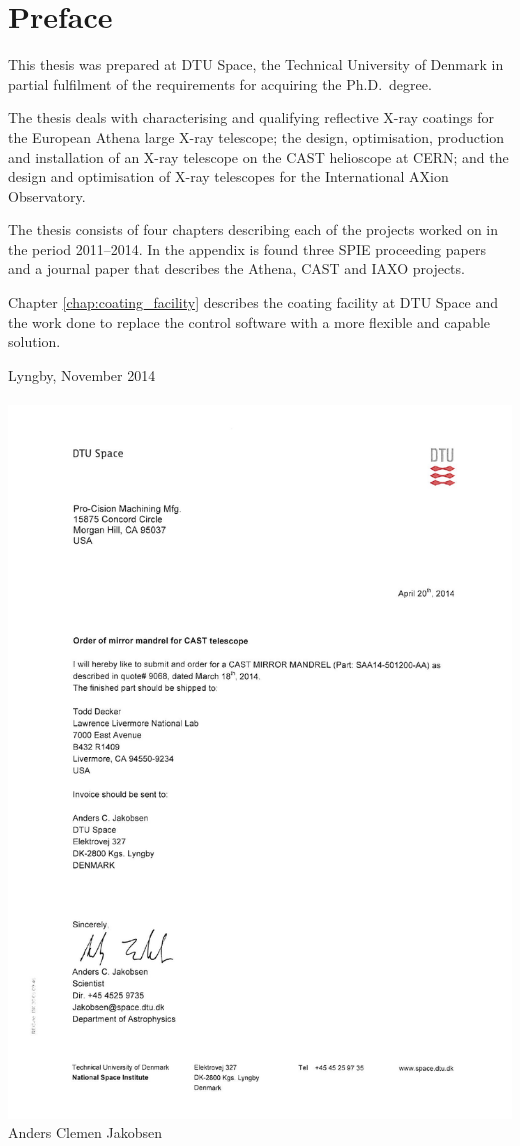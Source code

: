 \chapter{Preface}
This thesis was prepared at DTU Space,
the Technical University of Denmark in partial fulfilment of the
requirements for acquiring the Ph.D.\ degree.

The thesis deals with characterising and qualifying reflective X-ray coatings for the European Athena large X-ray telescope; the design, optimisation, production and installation of an X-ray telescope on the CAST helioscope at CERN; and the design and optimisation of X-ray telescopes for the International AXion Observatory.

The thesis consists of four chapters describing each of the projects worked on in the period 2011--2014. In the appendix is found three SPIE proceeding papers and a journal paper that describes the Athena, CAST and IAXO projects.

Chapter \ref{chap:coating_facility} describes the coating facility at DTU Space and the work done to replace the control software with a more flexible and capable solution.

\vspace{20mm}
\mbox{}\hfill
\begin{minipage}[t]{80mm}
  Lyngby, November 2014
  \\ \\
  \mbox{} \hspace{0mm} \includegraphics{figures/signature.pdf}\\
Anders Clemen Jakobsen
\end{minipage}
